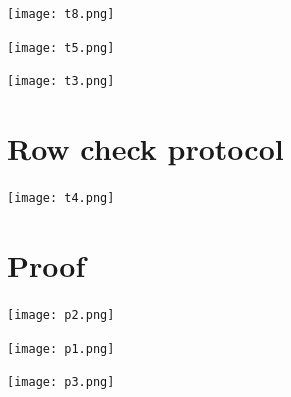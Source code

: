\documentclass{beamer}
\begin{document}
\begin{frame}{}
	\begin{minipage}{0.42\linewidth}
		\texttt{[image: t8.png]}
	\end{minipage}
\end{frame}


\begin{frame}{}
	\begin{minipage}{0.42\linewidth}
		\texttt{[image: t5.png]}
	\end{minipage}
\end{frame}



\begin{frame}{}
	\begin{minipage}{0.42\linewidth}
		\texttt{[image: t3.png]}
	\end{minipage}
\end{frame}

\section{Row check protocol}

\begin{frame}{}
	\begin{minipage}{0.42\linewidth}
		\texttt{[image: t4.png]}
	\end{minipage}
\end{frame}



\section{Proof}

\begin{frame}{}
	\begin{minipage}{0.42\linewidth}
		\texttt{[image: p2.png]}
	\end{minipage}
\end{frame}

\begin{frame}{}
	\begin{minipage}{0.42\linewidth}
		\texttt{[image: p1.png]}
	\end{minipage}
\end{frame}


\begin{frame}{}
	\begin{minipage}{0.42\linewidth}
		\texttt{[image: p3.png]}
	\end{minipage}
\end{frame}
\end{document}
